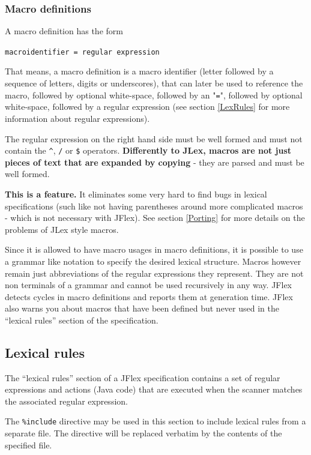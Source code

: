\documentclass[11pt]{scrartcl}
\begin{document}
\subsubsection{Macro definitions\label{MacroDefs}}
A macro definition has the form

\texttt{macroidentifier = regular expression}

That means, a macro definition is a macro identifier (letter followed
by a sequence of letters, digits or underscores), that can later be
used to reference the macro, followed by optional white-space, followed
by an "\texttt{=}", followed by optional white-space, followed by a
regular expression (see section \ref{LexRules}  for more information about regular expressions).

The regular expression on the right hand side must be well formed and
must not contain the \verb+^+, \texttt{/} or \texttt{\$} operators. {\bf Differently
to JLex, macros are not just pieces of text that are expanded by copying}
- they are parsed and must be well formed.

{\bf This is a feature.} It eliminates some very hard to find bugs in
lexical specifications (such like not having parentheses around more
complicated macros - which is not necessary with JFlex).  See section
\ref{Porting}  for more
details on the problems of JLex style macros.

Since it is allowed to have macro usages in macro definitions, it is
possible to use a grammar like notation to specify the desired lexical
structure. Macros however remain just abbreviations of the regular expressions
they represent. They are not non terminals of a grammar and cannot be used
recursively in any way. JFlex detects cycles in macro definitions and reports
them at generation time. JFlex also warns you about macros that have been
defined but never used in the ``lexical rules'' section of the specification.
  
\subsection{Lexical rules\label{LexRules}}
The ``lexical rules'' section of a JFlex specification contains a set of
regular expressions and actions (Java code) that are executed when the
scanner matches the associated regular expression.

The \texttt{\%include} directive may be used in this section to include
lexical rules from a separate file.  The directive will be replaced verbatim
by the contents of the specified file.
 
\end{document}
